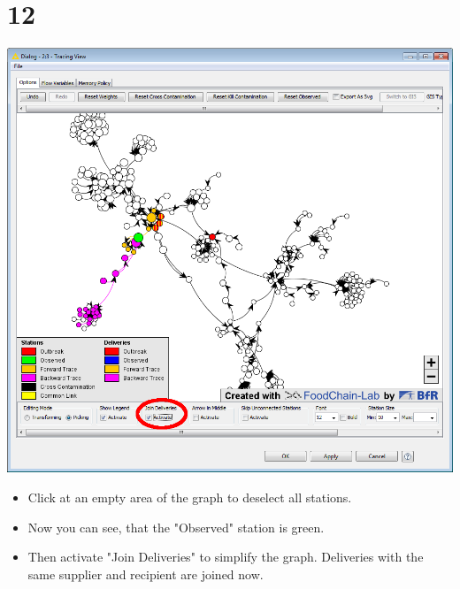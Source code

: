 \documentclass{beamer}
\begin{document}
\section{12}
\begin{frame}
	\begin{center}
  		\includegraphics[height=0.6\textheight]{12.png}
	\end{center}
	\begin{itemize}
		\item Click at an empty area of the graph to deselect all stations.
		\item Now you can see, that the "Observed" station is green.
		\item Then activate "Join Deliveries" to simplify the graph. Deliveries with the same supplier and recipient are joined now.
	\end{itemize}
\end{frame}
\end{document}

